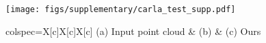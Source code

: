 \begin{figure} 
  \centering
  \vspace{-1.2em}
  \texttt{[image: figs/supplementary/carla\_test\_supp.pdf]}
    \begin{tblr}{colspec={X[c]X[c]X[c]}}
        \scriptsize{(a) Input point cloud} & \scriptsize{(b) \nksr} & \scriptsize{(c) Ours} \\
    \end{tblr} 
\caption{}
\label{fig:carla_additional_1}
\end{figure}


